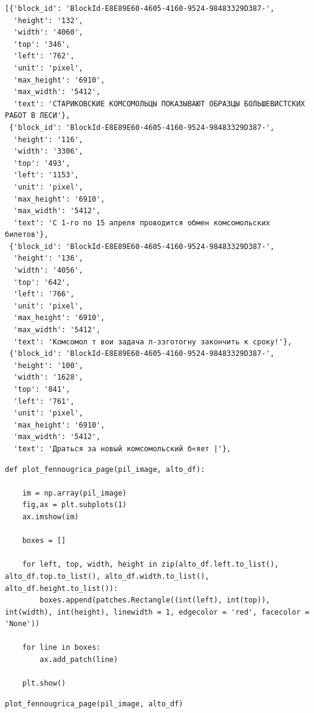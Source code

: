 \documentclass[]{book}
\begin{document}
\begin{verbatim}
[{'block_id': 'BlockId-E8E89E60-4605-4160-9524-98483329D387-',
  'height': '132',
  'width': '4060',
  'top': '346',
  'left': '762',
  'unit': 'pixel',
  'max_height': '6910',
  'max_width': '5412',
  'text': 'СТАРИКОВСКИЕ КОМСОМОЛЬЦЫ ПОКАЗЫВАЮТ ОБРАЗЦЫ БОЛЬШЕВИСТСКИХ РАБОТ В ЛЕСИ'},
 {'block_id': 'BlockId-E8E89E60-4605-4160-9524-98483329D387-',
  'height': '116',
  'width': '3306',
  'top': '493',
  'left': '1153',
  'unit': 'pixel',
  'max_height': '6910',
  'max_width': '5412',
  'text': 'С 1-го по 15 апреля проводится обмен комсомольских билетов'},
 {'block_id': 'BlockId-E8E89E60-4605-4160-9524-98483329D387-',
  'height': '136',
  'width': '4056',
  'top': '642',
  'left': '766',
  'unit': 'pixel',
  'max_height': '6910',
  'max_width': '5412',
  'text': 'Комсомол т вои задача л-ззготогну закончить к сроку!'},
 {'block_id': 'BlockId-E8E89E60-4605-4160-9524-98483329D387-',
  'height': '100',
  'width': '1628',
  'top': '841',
  'left': '761',
  'unit': 'pixel',
  'max_height': '6910',
  'max_width': '5412',
  'text': 'Драться за новый комсомольский б«яет |'},
\end{verbatim}

\begin{verbatim}
def plot_fennougrica_page(pil_image, alto_df):

    im = np.array(pil_image)
    fig,ax = plt.subplots(1)
    ax.imshow(im)

    boxes = []

    for left, top, width, height in zip(alto_df.left.to_list(), alto_df.top.to_list(), alto_df.width.to_list(), alto_df.height.to_list()):
        boxes.append(patches.Rectangle((int(left), int(top)), int(width), int(height), linewidth = 1, edgecolor = 'red', facecolor = 'None'))

    for line in boxes:
        ax.add_patch(line)

    plt.show()
\end{verbatim}

\begin{verbatim}
plot_fennougrica_page(pil_image, alto_df)
\end{verbatim}
\end{document}

